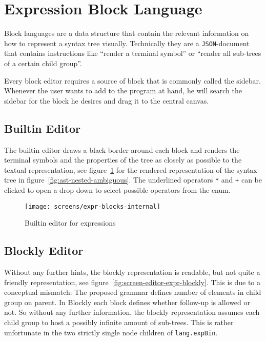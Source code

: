 \documentclass[sigconf,natbib=false,review=true]{acmart}
\begin{document}
\section{Expression Block Language}

Block languages are a data structure that contain the relevant information on how to represent a syntax tree visually. Technically they are a \texttt{JSON}-document that contains instructions like \enquote{render a terminal symbol} or \enquote{render all sub-trees of a certain child group}.

Every block editor requires a source of block that is commonly called the sidebar. Whenever the user wants to add to the program at hand, he will search the sidebar for the block he desires and drag it to the central canvas.

\subsection{Builtin Editor}

The builtin editor draws a black border around each block and renders the terminal symbols and the properties of the tree as closely as possible to the textual representation, see figure~\ref{fig:screen-editor-expr-internal} for the rendered representation of the syntax tree in figure~\ref{fig:ast-nested-ambiguous}. The underlined operators \texttt{*} and \texttt{+} can be clicked to open a drop down to select possible operators from the enum.

\begin{figure}
  \texttt{[image: screens/expr-blocks-internal]}
  \caption{Builtin editor for expressions}
  \label{fig:screen-editor-expr-internal}
\end{figure}

\subsection{Blockly Editor}

Without any further hints, the blockly representation is readable, but not quite a friendly representation, see figure~\ref{fig:screen-editor-expr-blockly}. This is due to a conceptual mismatch: The proposed grammar defines number of elements in child group on parent. In Blockly each block defines whether follow-up is allowed or not. So without any further information, the blockly representation assumes each child group to host a possibly infinite amount of sub-trees. This is rather unfortunate in the two strictly single node children of \texttt{lang.expBin}.
\end{document}
